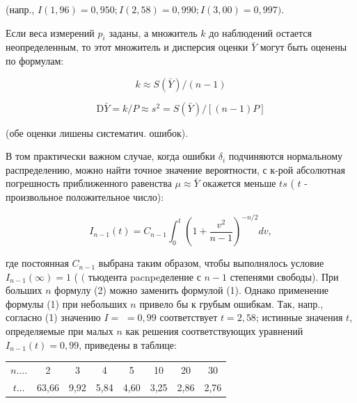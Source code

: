 \documentclass[10pt]{article}
\begin{document}
(напр., $I(1,96)=0,950 ; I(2,58)=0,990 ; I(3,00)=0,997)$.



Если веса измерений $p_{i}$ заданы, а множитель $k$ до наблюдений остается неопределенным, то этот множитель и дисперсия оценки $\bar{Y}$ могут быть оценены по формулам:



\[

k \approx S(\bar{Y}) /(n-1)

\]



\[

\mathrm{D} \bar{Y}=k / P \approx s^{2}=S(\bar{Y}) /[(n-1) P]

\]



(обе оценки лишены систематич. ошибок).



В том практически важном случае, когда ошибки $\delta_{i}$ подчиняются нормальному распределению, можно найти точное значение вероятности, с к-рой абсолютная погрешность приближенного равенства $\mu \approx \bar{Y}$ окажется меньше $t s$ ( $t$ - произвольное положительное число):



\[

I_{n-1}(t)=C_{n-1} \int_{0}^{t}\left(1+\frac{v^{2}}{n-1}\right)^{-n / 2} d v,

\]



где постоянная $C_{n-1}$ выбрана таким образом, чтобы выполнялось условие $I_{n-1}(\infty)=1$ ( $($ тьюдента pacnpeделение с $n-1$ степенями свободы). При больших $n$ формулу (2) можно заменить формулой (1). Однако применение формулы (1) при небольших $n$ привело бы к грубым ошибкам. Так, напр., согласно (1) значению $I=$ $=0,99$ соответствует $t=2,58$; истинные значения $t$, определяемые при малых $n$ как решения соответствующих уравнений $I_{n-1}(t)=0,99$, приведены в таблице:



\begin{center}

\begin{tabular}{c|c|c|c|c|c|c|c}

\hline

$n \ldots$. & 2 & 3 & 4 & 5 & 10 & 20 & 30 \\

$t \ldots$ & 63,66 & 9,92 & 5,84 & 4,60 & 3,25 & 2,86 & 2,76 \\

\hline

\end{tabular}

\end{center}
\end{document}
